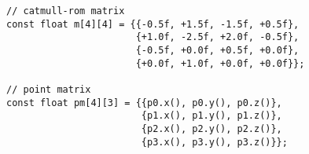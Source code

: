\begin{lstlisting}
// catmull-rom matrix
const float m[4][4] = {{-0.5f, +1.5f, -1.5f, +0.5f},
                       {+1.0f, -2.5f, +2.0f, -0.5f},
                       {-0.5f, +0.0f, +0.5f, +0.0f},
                       {+0.0f, +1.0f, +0.0f, +0.0f}};

// point matrix
const float pm[4][3] = {{p0.x(), p0.y(), p0.z()},
                        {p1.x(), p1.y(), p1.z()},
                        {p2.x(), p2.y(), p2.z()},
                        {p3.x(), p3.y(), p3.z()}};
\end{lstlisting}

